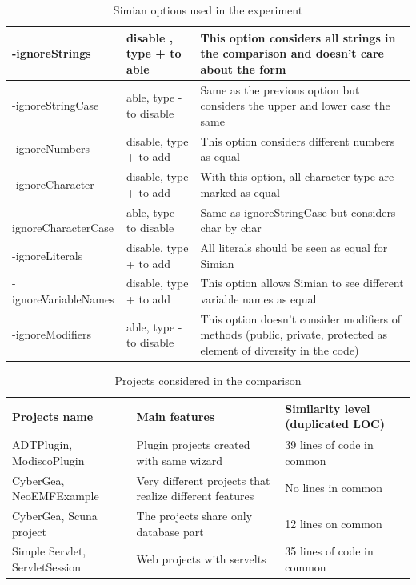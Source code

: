 \begin{center}
\begin{table}[!h]
\begin{tabular}{|l|p{4cm}|p{6cm}|}
			-ignoreStrings & disable , type + to able &  This option considers all strings in the comparison and doesn't care about the form \\\hline
			-ignoreStringCase & able, type - to disable & Same as the previous option but considers the upper and lower case the same \\\hline
			-ignoreNumbers & disable, type + to add &   This option considers different numbers as equal  \\\hline
			-ignoreCharacter & disable, type + to add &   With this option, all character type are marked as equal  \\\hline
			-ignoreCharacterCase & able, type - to disable &  Same as ignoreStringCase but considers char by char \\\hline
			-ignoreLiterals & disable, type + to add &   All literals should be seen as equal for Simian  \\\hline
			-ignoreVariableNames & disable, type + to add &   This option allows Simian to see different variable names as equal \\\hline
			-ignoreModifiers & able, type - to disable &   This option doesn't consider modifiers of methods  (public, private, protected as element of  diversity in the code)\\\hline				
		\end{tabular}			
		\caption{ Simian options used in the experiment}
		\label{Table:3}
\end{table} 
\end{center}


\begin{table}[!h]
	\small
	\begin{tabular}{|l|p{5cm}|p{3cm}|}	\hline
		\textbf{Projects name} &  \textbf{Main features}  & \textbf{Similarity level (duplicated LOC)}  \\\hline
		ADTPlugin, ModiscoPlugin   &  Plugin projects created with same wizard & 39 lines of code in common \\\hline
		CyberGea, NeoEMFExample &   Very different projects that realize different features & No lines in common \\\hline
		CyberGea, Scuna project & The projects share only database part & 12 lines on common  \\\hline
		Simple Servlet, ServletSession &  Web projects with servelts & 35 lines of code in common  \\\hline
	\end{tabular}
	\caption{ Projects considered in the comparison }
	\label{Table:4}	
\end{table} 



